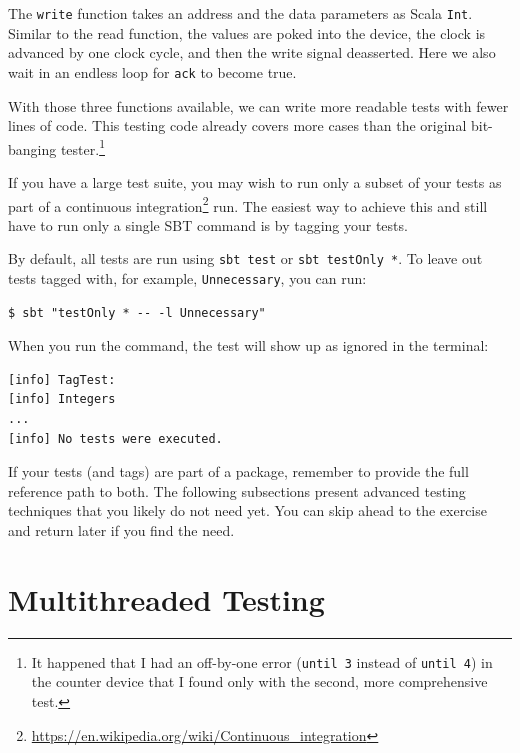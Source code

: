 \documentclass[%
    10pt,
    headinclude, footexclude,
    openright, %
    notitlepage,
    cleardoubleempty,
    headsepline,
    pointlessnumbers,
    bibtotoc, idxtotoc,
    ]{scrbook}
\newcommand{\code}[1]{{\small{\texttt{#1}}}}
\newcommand{\myref}[2]{\href{#1}{#2}}
\renewcommand{\myref}[2]{{#2}{\footnote{\url{#1}}}}
\begin{document}
The \code{write} function takes an address and the data parameters as Scala \code{Int}.
Similar to the read function, the values are poked into the device, the clock is advanced by one
clock cycle, and then the write signal deasserted. Here we also wait in an endless loop for
\code{ack} to become true.

With those three functions available, we can write more readable tests with fewer lines of code.
This testing code already covers more cases than the original bit-banging
tester.\footnote{It happened that I had an off-by-one error (\code{until 3} instead of \code{until 4})
in the counter device that I found only with the second, more comprehensive test.}



If you have a large test suite, you may wish to run only a subset of your tests
as part of a \myref{https://en.wikipedia.org/wiki/Continuous_integration}{continuous integration}
run. The easiest way to achieve this and still have to run only a single SBT command
is by tagging your tests.


\noindent By default, all tests are run using \code{sbt test} or \code{sbt testOnly *}.
To leave out tests tagged with, for example, \code{Unnecessary}, you can run:

\begin{verbatim}
$ sbt "testOnly * -- -l Unnecessary"
\end{verbatim}

\noindent When you run the command, the test will show up as ignored in the terminal:

\begin{verbatim}
[info] TagTest:
[info] Integers
...
[info] No tests were executed.
\end{verbatim}

If your tests (and tags) are part of a package, remember to provide the full
reference path to both.
The following subsections present advanced testing techniques that you likely do
not need yet. You can skip ahead to the exercise and return later if you find the need.

\section{Multithreaded Testing}
\end{document}
